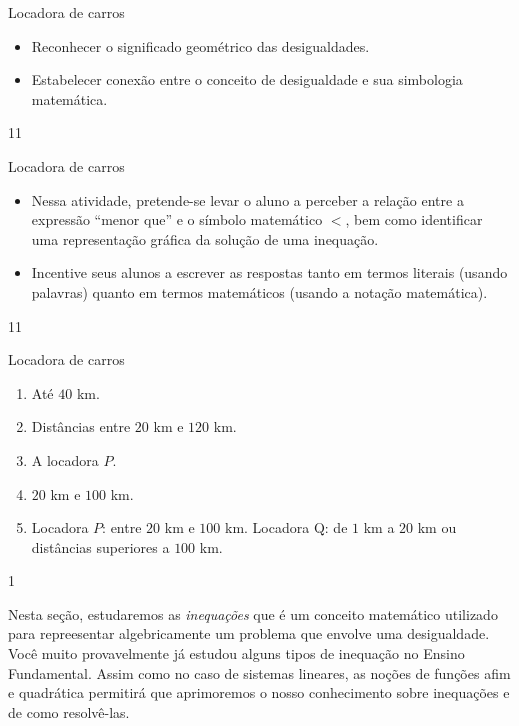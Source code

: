 \cleardoublepage
\def\currentcolor{session1}
\begin{objectives}{Locadora de carros}
{
\begin{itemize}
\item Reconhecer o significado geométrico das desigualdades.
 \item Estabelecer conexão entre o conceito de desigualdade e sua simbologia matemática.
\end{itemize}
}{1}{1}
\end{objectives}
\begin{sugestions}{Locadora de carros}
{
\begin{itemize}
\item Nessa atividade, pretende-se levar o aluno a perceber a relação entre a expressão “menor que” e o símbolo matemático $<$, bem como identificar uma representação gráfica da solução de uma inequação.
\item Incentive seus alunos a escrever as respostas tanto em termos literais (usando palavras) quanto em termos matemáticos (usando a notação matemática).
\end{itemize}
}{1}{1}
\end{sugestions}
\begin{answer}{Locadora de carros}
{
\begin{enumerate}
\item Até $40$ km.
\item Distâncias entre $20$ km e $120$ km.
\item A locadora $P$.
\item  $20$ km e $100$ km. 
\item Locadora $P$: entre $20$ km e $100$ km.
Locadora Q: de $1$ km a $20$ km ou distâncias superiores a $100$ km.
\end{enumerate}
}{1}
\end{answer}
\label{\detokenize{AF107-6:inequacoes}}\label{\detokenize{AF107-6::doc}}

Nesta seção, estudaremos as \emph{inequações} que é um conceito matemático utilizado para repreesentar algebricamente um problema que envolve uma desigualdade. Você muito provavelmente já estudou alguns tipos de inequação no Ensino Fundamental. Assim como no caso de sistemas lineares, as noções de funções afim e quadrática permitirá que aprimoremos o nosso conhecimento sobre inequações e de como resolvê-las. 


